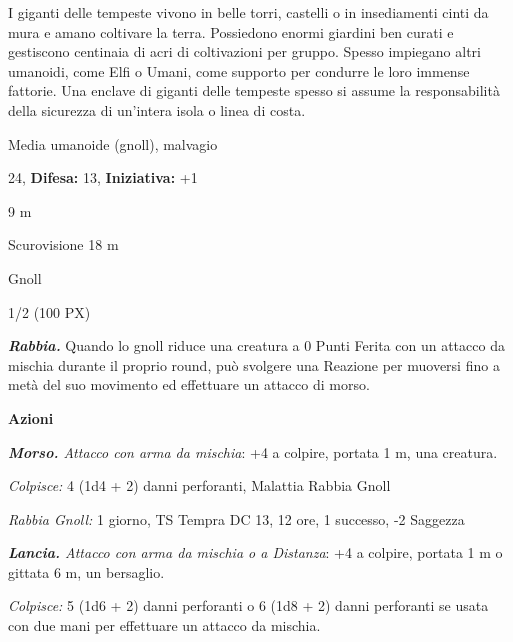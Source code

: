 \begin{multicols}{2}
{I giganti delle tempeste vivono in belle torri, castelli o in insediamenti cinti da mura e amano coltivare la terra. Possiedono enormi giardini ben curati e gestiscono centinaia di acri di coltivazioni per gruppo. Spesso impiegano altri umanoidi, come Elfi o Umani, come supporto per condurre le loro immense fattorie. Una enclave di giganti delle tempeste spesso si assume la responsabilità della sicurezza di un'intera isola o linea di costa.

\noindent
\begin{description}[noitemsep, topsep=0pt, parsep=0pt, partopsep=0pt, leftmargin=0cm, labelwidth=2.2cm]
	\item[\textbf{Taglia/Tipo:}] Media umanoide (gnoll), malvagio
	\item[\textbf{Caratt.:}] 
	\item[\textbf{Punti Ferita:}] 24,  \textbf{Difesa:} 13,  \textbf{Iniziativa:} +1
	\item[\textbf{Movimento:}] 9 m
	\item[\textbf{Tiri Salvez.:}] 
	\item[\textbf{Sensi:}] Scurovisione 18 m
	\item[\textbf{Linguaggi:}] Gnoll
	\item[\textbf{Sfida:}] 1/2 (100 PX)\smallskip
\end{description}

\emph{\textbf{Rabbia.}} Quando lo gnoll riduce una creatura a 0 Punti Ferita con un attacco da mischia durante il proprio round, può svolgere una Reazione per muoversi fino a metà del suo movimento ed effettuare un attacco di morso.

\textbf{Azioni}

\emph{\textbf{Morso.} Attacco con arma da mischia}: +4 a colpire, portata 1 m, una creatura.

\emph{Colpisce:} 4 (1d4 + 2) danni perforanti, Malattia Rabbia Gnoll

\emph{Rabbia Gnoll:} 1 giorno, TS Tempra DC 13, 12 ore, 1 successo, -2 Saggezza

\emph{\textbf{Lancia.} Attacco con arma da mischia o a Distanza}: +4 a colpire, portata 1 m o gittata 6 m, un bersaglio.

\emph{Colpisce:} 5 (1d6 + 2) danni perforanti o 6 (1d8 + 2) danni perforanti se usata con due mani per effettuare un attacco da mischia.

}
\end{multicols}
